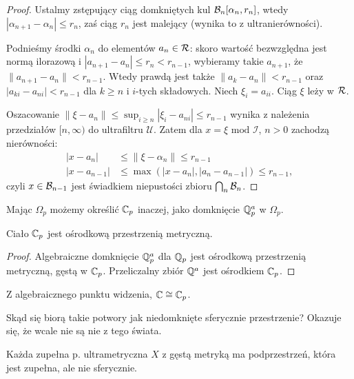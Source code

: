 \begin{proof}
	Ustalmy zstępujący ciąg domkniętych kul $\mathcal B_n[\alpha_n, r_n]$, wtedy $|\alpha_{n+1} - \alpha_n| \le r_n$, zaś ciąg $r_n$ jest malejący (wynika to z ultranierówności).

	Podnieśmy środki $\alpha_n$ do elementów $a_n \in \mathcal R$: skoro wartość bezwzględna jest normą ilorazową i $|a_{n+1} - a_n| \le r_n < r_{n-1}$, wybieramy takie $a_{n+1}$, że $\|a_{n+1} - a_n\| < r_{n-1}$.
	Wtedy prawdą jest także $\|a_k - a_n\| < r_{n-1}$ oraz $|a_{ki} - a_{ni}| <r_{n-1}$ dla $k \ge n$ i $i$-tych składowych.
	Niech $\xi_i = a_{ii}$.
	Ciąg $\xi$ leży w $\mathcal R$.
	
	Oszacowanie $\|\xi - a_n\| \le \sup_{i \ge n} |\xi_i - a_{ni}| \le r_{n-1}$ wynika z należenia przedziałów $[n, \infty)$ do ultrafiltru $\mathcal U$.
	Zatem dla $x = \xi \mbox{ mod } \mathcal I$, $n > 0$ zachodzą nierówności:
	\begin{align*}
		|x - a_n| & \le \|\xi - \alpha_n\| \le r_{n-1} \\
		|x-a_{n-1}| & \le \max(|x-a_n|, |a_n-a_{n-1}|) \le r_{n-1},
	\end{align*}
	czyli $x \in \mathcal B_{n-1}$ jest świadkiem niepustości zbioru $\bigcap_n \mathcal B_n$.
\end{proof}

Mając $\Omega_p$ możemy określić $\mathbb C_p$ inaczej, jako domknięcie $\mathbb Q_p^a$ w $\Omega_p$.

\begin{fakt}
	Ciało $\mathbb C_p$ jest ośrodkową przestrzenią metryczną.
\end{fakt}

\begin{proof}
	Algebraiczne domknięcie $\mathbb Q_p^a$ dla $\mathbb Q_p$ jest ośrodkową przestrzenią metryczną, gęstą w $\mathbb C_p$.
	Przeliczalny zbiór $\mathbb Q^a$ jest ośrodkiem $\mathbb C_p$.
\end{proof}

\begin{fakt}
	Z algebraicznego punktu widzenia, $\mathbb C \cong \mathbb C_p$.
\end{fakt}

Skąd się biorą takie potwory jak niedomknięte sferycznie przestrzenie?
Okazuje się, że wcale nie są nie z tego świata.

\begin{fakt}
	Każda zupełna p. ultrametryczna $X$ z gęstą metryką ma podprzestrzeń, która jest zupełna, ale nie sferycznie.
\end{fakt}

